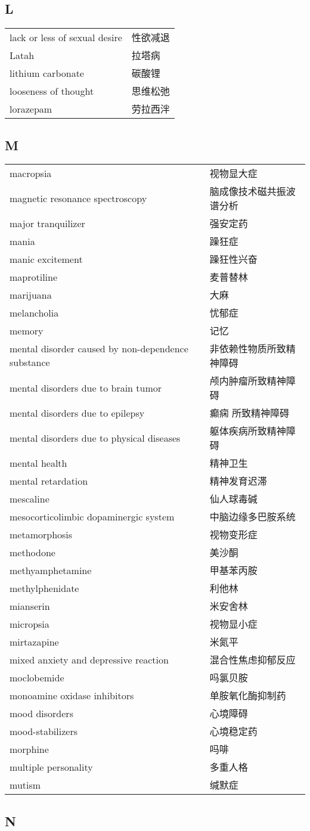 \subsection*{L}

\begin{longtable}[]{@{}ll@{}}
\toprule
\endhead
lack or less of sexual desire & 性欲减退\tabularnewline
Latah & 拉塔病\tabularnewline
lithium carbonate & 碳酸锂\tabularnewline
looseness of thought & 思维松弛\tabularnewline
lorazepam & 劳拉西泮\tabularnewline
\bottomrule
\end{longtable}

\subsection*{M}

\begin{longtable}[]{@{}ll@{}}
\toprule
\endhead
macropsia & 视物显大症\tabularnewline
magnetic resonance spectroscopy &
脑成像技术磁共振波谱分析\tabularnewline
major tranquilizer & 强安定药\tabularnewline
mania & 躁狂症\tabularnewline
manic excitement & 躁狂性兴奋\tabularnewline
maprotiline & 麦普替林\tabularnewline
marijuana & 大麻\tabularnewline
melancholia & 忧郁症\tabularnewline
memory & 记忆\tabularnewline
mental disorder caused by non-dependence substance &
非依赖性物质所致精神障碍\tabularnewline
mental disorders due to brain tumor &
颅内肿瘤所致精神障碍\tabularnewline
mental disorders due to epilepsy &
癫痫 所致精神障碍\tabularnewline
mental disorders due to physical diseases &
躯体疾病所致精神障碍\tabularnewline
mental health & 精神卫生\tabularnewline
mental retardation & 精神发育迟滞\tabularnewline
mescaline & 仙人球毒碱\tabularnewline
mesocorticolimbic dopaminergic system &
中脑边缘多巴胺系统\tabularnewline
metamorphosis & 视物变形症\tabularnewline
methodone & 美沙酮\tabularnewline
methyamphetamine & 甲基苯丙胺\tabularnewline
methylphenidate & 利他林\tabularnewline
mianserin & 米安舍林\tabularnewline
micropsia & 视物显小症\tabularnewline
mirtazapine & 米氮平\tabularnewline
mixed anxiety and depressive reaction &
混合性焦虑抑郁反应\tabularnewline
moclobemide & 吗氯贝胺\tabularnewline
monoamine oxidase inhibitors & 单胺氧化酶抑制药\tabularnewline
mood disorders & 心境障碍\tabularnewline
mood-stabilizers & 心境稳定药\tabularnewline
morphine & 吗啡\tabularnewline
multiple personality & 多重人格\tabularnewline
mutism & 缄默症\tabularnewline
\bottomrule
\end{longtable}

\subsection*{N}

